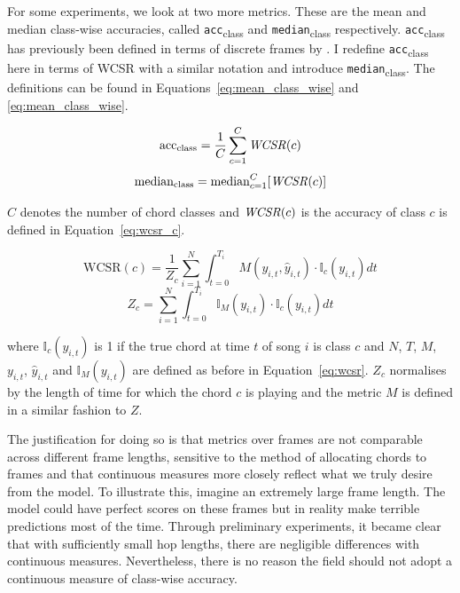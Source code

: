 For some experiments, we look at two more metrics. These are the mean and median class-wise accuracies, called \texttt{acc}\textsubscript{class} and \texttt{median}\textsubscript{class} respectively. \texttt{acc}\textsubscript{class} has previously been defined in terms of discrete frames by \citet{ACRLargeVocab1}. I redefine \texttt{acc}\textsubscript{class} here in terms of WCSR with a similar notation and introduce \texttt{median}\textsubscript{class}. The definitions can be found in Equations~\ref{eq:mean_class_wise} and \ref{eq:mean_class_wise}.

\begin{equation}\label{eq:mean_class_wise}
    \text{acc}\textsubscript{class} = \frac{1}{C} \sum_{c=1}^{C} \text{\emph{WCSR}}(c)
\end{equation}
\begin{equation}\label{eq:median_class_wise}
    \text{median}\textsubscript{class} = \text{median}_{c=1}^{C} [\text{\emph{WCSR}}(c)]
\end{equation}

$C$ denotes the number of chord classes and $\text{\emph{WCSR}}(c)$ is the accuracy of class $c$ is defined in Equation~\ref{eq:wcsr_c}.

\begin{equation}\label{eq:wcsr_c}
    \text{WCSR}(c) = \frac{1}{Z_c}\sum_{i=1}^{N} \int_{t=0}^{T_i} M(y_{i,t},\hat{y}_{i,t}) \cdot \mathbb{I}_c(y_{i,t}) dt
\end{equation}
\begin{equation}
    Z_c = \sum_{i=1}^{N} \int_{t=0}^{T_i} \mathbb{I}_M(y_{i,t})\cdot \mathbb{I}_c(y_{i,t}) dt
\end{equation}

where $\mathbb{I}_c(y_{i,t})$ is 1 if the true chord at time $t$ of song $i$ is class $c$ and $N$, $T$, $M$, $y_{i,t}$, $\hat{y}_{i,t}$ and $\mathbb{I}_M(y_{i,t})$ are defined as before in Equation~\ref{eq:wcsr}. $Z_c$ normalises by the length of time for which the chord $c$ is playing and the metric $M$ is defined in a similar fashion to $Z$. 

The justification for doing so is that metrics over frames are not comparable across different frame lengths, sensitive to the method of allocating chords to frames and that continuous measures more closely reflect what we truly desire from the model. To illustrate this, imagine an extremely large frame length. The model could have perfect scores on these frames but in reality make terrible predictions most of the time. Through preliminary experiments, it became clear that with sufficiently small hop lengths, there are negligible differences with continuous measures. Nevertheless, there is no reason the field should not adopt a continuous measure of class-wise accuracy.

